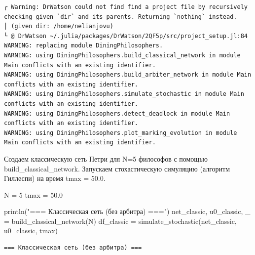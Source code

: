 \documentclass[
  12pt,
  a4paper,
  DIV=11,
  numbers=noendperiod]{scrreprt}
\newenvironment{Shaded}{\begin{snugshade}}{\end{snugshade}}
\newcommand{\FloatTok}[1]{\textcolor[rgb]{0.68,0.00,0.00}{#1}}
\newcommand{\FunctionTok}[1]{\textcolor[rgb]{0.28,0.35,0.67}{#1}}
\newcommand{\NormalTok}[1]{\textcolor[rgb]{0.00,0.23,0.31}{#1}}
\newcommand{\OperatorTok}[1]{\textcolor[rgb]{0.37,0.37,0.37}{#1}}
\newcommand{\StringTok}[1]{\textcolor[rgb]{0.13,0.47,0.30}{#1}}
\begin{document}
\begin{verbatim}
┌ Warning: DrWatson could not find find a project file by recursively checking given `dir` and its parents. Returning `nothing` instead.
│ (given dir: /home/nelianjovu)
└ @ DrWatson ~/.julia/packages/DrWatson/2QF5p/src/project_setup.jl:84
WARNING: replacing module DiningPhilosophers.
WARNING: using DiningPhilosophers.build_classical_network in module Main conflicts with an existing identifier.
WARNING: using DiningPhilosophers.build_arbiter_network in module Main conflicts with an existing identifier.
WARNING: using DiningPhilosophers.simulate_stochastic in module Main conflicts with an existing identifier.
WARNING: using DiningPhilosophers.detect_deadlock in module Main conflicts with an existing identifier.
WARNING: using DiningPhilosophers.plot_marking_evolution in module Main conflicts with an existing identifier.
\end{verbatim}

Создаем классическую сеть Петри для N=5 философов с помощью
build\_classical\_network. Запускаем стохастическую симуляцию (алгоритм
Гиллеспи) на время tmax = 50.0.

\begin{Shaded}
\begin{Highlighting}[]
\NormalTok{N }\OperatorTok{=} \FloatTok{5}
\NormalTok{tmax }\OperatorTok{=} \FloatTok{50.0}

\FunctionTok{println}\NormalTok{(}\StringTok{"=== Классическая сеть (без арбитра) ==="}\NormalTok{)}
\NormalTok{net\_classic, u0\_classic, \_ }\OperatorTok{=} \FunctionTok{build\_classical\_network}\NormalTok{(N)}
\NormalTok{df\_classic }\OperatorTok{=} \FunctionTok{simulate\_stochastic}\NormalTok{(net\_classic, u0\_classic, tmax)}
\end{Highlighting}
\end{Shaded}

\begin{verbatim}
=== Классическая сеть (без арбитра) ===
\end{verbatim}
\end{document}
